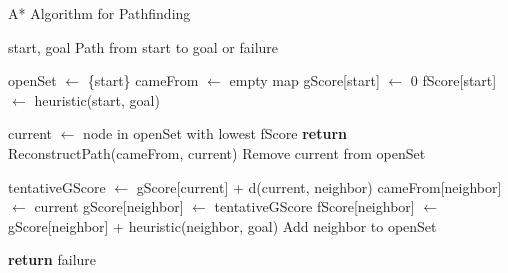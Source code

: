 \begin{algorithm}
\caption{A* Algorithm for Pathfinding}
\label{alg:astar}
\begin{algorithmic}
    \REQUIRE start, goal
    \ENSURE Path from start to goal or failure
    
    \STATE openSet $\gets$ \{start\}
    \STATE cameFrom $\gets$ empty map
    \STATE gScore[start] $\gets$ 0
    \STATE fScore[start] $\gets$ heuristic(start, goal)
    
        \STATE current $\gets$ node in openSet with lowest fScore
            \STATE \textbf{return} ReconstructPath(cameFrom, current)
        \ENDIF
        \STATE Remove current from openSet
        
            \STATE tentativeGScore $\gets$ gScore[current] + d(current, neighbor)
                \STATE cameFrom[neighbor] $\gets$ current
                \STATE gScore[neighbor] $\gets$ tentativeGScore
                \STATE fScore[neighbor] $\gets$ gScore[neighbor] + heuristic(neighbor, goal)
                    \STATE Add neighbor to openSet
                \ENDIF
            \ENDIF
        \ENDFOR
    \ENDWHILE

    \STATE \textbf{return} failure

\end{algorithmic}
\end{algorithm}